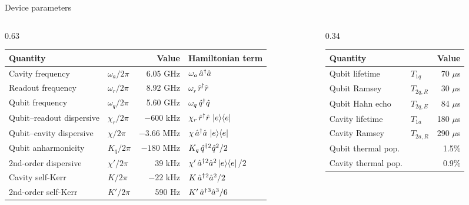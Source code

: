 \begin{frame}{Device parameters}
  \scriptsize
  \setlength{\tabcolsep}{4pt}
  \begin{columns}[T]
    \begin{column}{0.63\textwidth}
      \begin{tabular}{@{}l l r l@{}}
        \hline
        Quantity & & Value & Hamiltonian term \\
        \hline
        Cavity frequency & $\omega_a/2\pi$ & 6.05 GHz & $\omega_a\,\hat{a}^{\dagger}\hat{a}$ \\
        Readout frequency & $\omega_r/2\pi$ & 8.92 GHz & $\omega_r\,\hat r^\dagger\hat r$ \\
        Qubit frequency & $\omega_q/2\pi$ & 5.60 GHz & $\omega_q\,\hat{q}^{\dagger}\hat{q}$ \\
        Qubit--readout dispersive & $\chi_r/2\pi$ & $-600$ kHz &
             $\chi_r\,\hat r^\dagger\hat r\,\left|e\right\rangle\!\left\langle e\right|$ \\
        Qubit--cavity dispersive & $\chi/2\pi$ & $-3.66$ MHz & $\chi\,\hat{a}^{\dagger}\hat{a}\,\left|e\right\rangle\!\left\langle e\right|$ \\
        Qubit anharmonicity & $K_q/2\pi$ & $-180$ MHz & $K_q\,\hat{q}^{\dagger}{}^2\hat{q}^2/2$ \\
        2nd-order dispersive & $\chi'/2\pi$ & 39 kHz & $\chi'\,\hat{a}^{\dagger}{}^2\hat{a}^2\left|e\right\rangle\!\left\langle e\right|/2$ \\
        Cavity self-Kerr & $K/2\pi$ & $-22$ kHz & $K\,\hat{a}^{\dagger}{}^2\hat{a}^2/2$ \\
        2nd-order self-Kerr & $K'/2\pi$ & 590 Hz & $K'\,\hat{a}^{\dagger}{}^3\hat{a}^3/6$ \\
        \hline
      \end{tabular}
    \end{column}
    \begin{column}{0.34\textwidth}
      \begin{tabular}{@{}l l r@{}}
        \hline
        Quantity & & Value \\
        \hline
        Qubit lifetime & $T_{1q}$ & 70 $\mu$s \\
        Qubit Ramsey & $T_{2q,R}$ & 30 $\mu$s \\
        Qubit Hahn echo & $T_{2q,E}$ & 84 $\mu$s \\
        Cavity lifetime & $T_{1a}$ & 180 $\mu$s \\
        Cavity Ramsey & $T_{2a,R}$ & 290 $\mu$s \\
        Qubit thermal pop. & & 1.5\% \\
        Cavity thermal pop. & & 0.9\% \\
        \hline
      \end{tabular}
    \end{column}
  \end{columns}


\end{frame}
